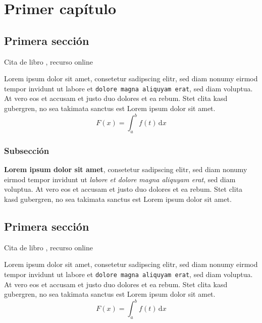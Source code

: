 
\chapter{Primer capítulo}\label{ch:primer-capitulo}

\section{Primera sección}
Cita de libro \cite{Euler1982, Euler1984, Euler1985}, \cite{EulerWiki} recurso online


Lorem ipsum dolor sit amet, \textsf{consetetur sadipscing elitr}, sed diam nonumy eirmod
tempor invidunt ut labore et \texttt{dolore magna aliquyam erat}, sed diam voluptua. At vero eos et accusam et justo duo dolores et ea rebum. Stet clita kasd gubergren, no sea takimata sanctus est Lorem ipsum dolor sit amet.
\[
F(x) = \int_a^b f(t)\, \mathrm{d}x
\]


\subsection{Subsección}

{\ttfamily
\textbf{Lorem ipsum dolor sit amet}, consetetur sadipscing elitr, sed diam nonumy eirmod tempor invidunt ut \textit{labore et dolore magna aliquyam erat}, sed diam voluptua. At vero eos et accusam et justo duo dolores et ea rebum. Stet clita kasd gubergren, no sea takimata sanctus est Lorem ipsum dolor sit amet.
}

\newpage
\section{Primera sección}
Cita de libro \cite{Euler1982, Euler1984, Euler1985}, \cite{EulerWiki} recurso online


Lorem ipsum dolor sit amet, \textsf{consetetur sadipscing elitr}, sed diam nonumy eirmod
tempor invidunt ut labore et \texttt{dolore magna aliquyam erat}, sed diam voluptua. At vero eos et accusam et justo duo dolores et ea rebum. Stet clita kasd gubergren, no sea takimata sanctus est Lorem ipsum dolor sit amet.
\[
  F(x) = \int_a^b f(t)\, \mathrm{d}x
\]


